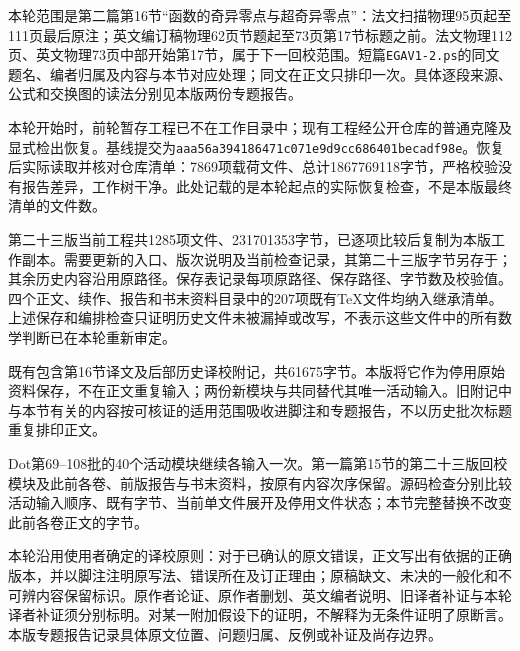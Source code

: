 \label{audit:V24-integration}

本轮范围是第二篇第16节“函数的奇异零点与超奇异零点”：法文扫描物理95页起至111页最后原注；英文编订稿物理62页节题起至73页第17节标题之前。法文物理112页、英文物理73页中部开始第17节，属于下一回校范围。短篇\texttt{EGAV1-2.ps}的同文题名、编者归属及内容与本节对应处理；同文在正文只排印一次。具体逐段来源、公式和交换图的读法分别见本版两份专题报告。

本轮开始时，前轮暂存工程已不在工作目录中；现有工程经公开仓库的普通克隆及显式检出恢复。基线提交为\texttt{aaa56a39\allowbreak 4186471c\allowbreak 071e9d9c\allowbreak c686401b\allowbreak ecadf98e}。恢复后实际读取并核对仓库清单：7869项载荷文件、总计1867769118字节，严格校验没有报告差异，工作树干净。此处记载的是本轮起点的实际恢复检查，不是本版最终清单的文件数。

第二十三版当前工程共1285项文件、231701353字节，已逐项比较后复制为本版工作副本。需要更新的入口、版次说明及当前检查记录，其第二十三版字节另存于；其余历史内容沿用原路径。保存表记录每项原路径、保存路径、字节数及校验值。四个正文、续作、报告和书末资料目录中的207项既有TeX文件均纳入继承清单。上述保存和编排检查只证明历史文件未被漏掉或改写，不表示这些文件中的所有数学判断已在本轮重新审定。

既有包含第16节译文及后部历史译校附记，共61675字节。本版将它作为停用原始资料保存，不在正文重复输入；两份新模块与共同替代其唯一活动输入。旧附记中与本节有关的内容按可核证的适用范围吸收进脚注和专题报告，不以历史批次标题重复排印正文。

Dot第69--108批的40个活动模块继续各输入一次。第一篇第15节的第二十三版回校模块及此前各卷、前版报告与书末资料，按原有内容次序保留。源码检查分别比较活动输入顺序、既有字节、当前单文件展开及停用文件状态；本节完整替换不改变此前各卷正文的字节。

本轮沿用使用者确定的译校原则：对于已确认的原文错误，正文写出有依据的正确版本，并以脚注注明原写法、错误所在及订正理由；原稿缺文、未决的一般化和不可辨内容保留标识。原作者论证、原作者删划、英文编者说明、旧译者补证与本轮译者补证须分别标明。对某一附加假设下的证明，不解释为无条件证明了原断言。本版专题报告记录具体原文位置、问题归属、反例或补证及尚存边界。

